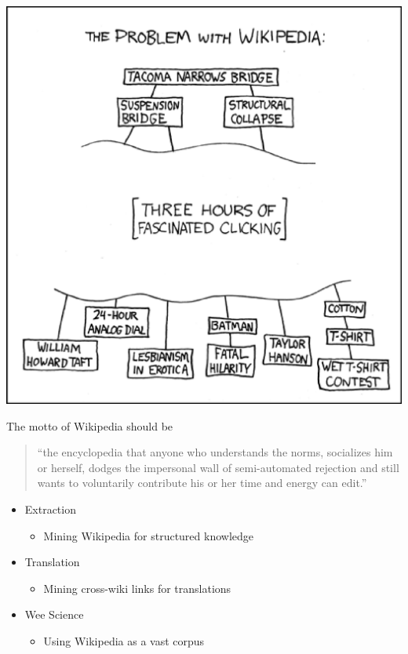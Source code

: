 \documentclass[a4paper,landscape,headrule,footrule,xetex]{foils}
\begin{document}
\begin{center}
  \includegraphics[height=\textheight]{../pics/xkcd-problem_wiki}
\end{center}


\begin{large}
  The motto of Wikipedia should be 
  \begin{quote}
    ``the encyclopedia that anyone who understands the norms,
    socializes him or herself, dodges the impersonal wall of
    semi-automated rejection and still wants to voluntarily contribute
    his or her time and energy can edit.''
  \end{quote}
\end{large}

\MyLogo{}

\begin{itemize}
\item Extraction
  \begin{itemize}
  \item Mining Wikipedia for structured knowledge
  \end{itemize}
\item Translation
  \begin{itemize}
  \item Mining cross-wiki links for translations 
  \end{itemize}
\item Wee Science
  \begin{itemize}
  \item Using Wikipedia as a vast corpus
  \end{itemize}
\end{itemize}
\end{document}
